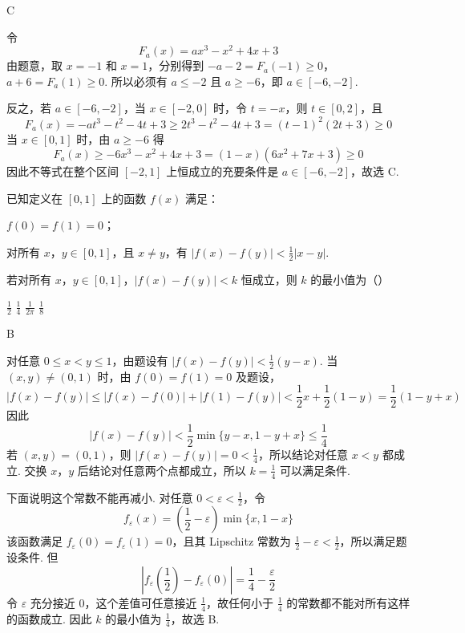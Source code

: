 \begin{answer}
C
\end{answer}

\begin{solution}
令
\[
F_a(x)=ax^3-x^2+4x+3
\]
由题意，取 \(x=-1\) 和 \(x=1\)，分别得到
\(-a-2=F_a(-1)\geqslant0\)，\(a+6=F_a(1)\geqslant0\).
所以必须有 \(a\leqslant-2\) 且 \(a\geqslant-6\)，即 \(a\in[-6,-2]\).

反之，若 \(a\in[-6,-2]\)，当 \(x\in[-2,0]\) 时，令 \(t=-x\)，则 \(t\in[0,2]\)，且
\[
F_a(x)=-at^3-t^2-4t+3
\geqslant2t^3-t^2-4t+3
=(t-1)^2(2t+3)\geqslant0
\]
当 \(x\in[0,1]\) 时，由 \(a\geqslant-6\) 得
\[
F_a(x)\geqslant-6x^3-x^2+4x+3
=(1-x)(6x^2+7x+3)\geqslant0
\]
因此不等式在整个区间 \([-2,1]\) 上恒成立的充要条件是 \(a\in[-6,-2]\)，故选 C.
\end{solution}

\begin{problem}
已知定义在 \([0,1]\) 上的函数 \(f(x)\) 满足：

\begin{circlelist}
\item \(f(0) = f(1) = 0\)；
\item 对所有 \(x\)，\(y\in[0,1]\)，且 \(x \neq y\)，有 \(|f(x) - f(y)| < \frac{1}{2} |x - y|\).
\end{circlelist}

若对所有 \(x\)，\(y\in[0,1]\)，\(|f(x) - f(y)| < k\) 恒成立，则 \(k\) 的最小值为（\quad）

\choices
    {\(\frac{1}{2}\)}
    {\( \frac{1}{4} \)}
    {\( \frac{1}{2\pi} \)}
    {\(\frac{1}{8}\)}
\end{problem}

\begin{answer}
B
\end{answer}

\begin{solution}
对任意 \(0\leqslant x<y\leqslant1\)，由题设有 \(|f(x)-f(y)|<\frac12(y-x)\). 当 \((x,y)\neq(0,1)\) 时，由 \(f(0)=f(1)=0\) 及题设，
\[
|f(x)-f(y)|\leqslant|f(x)-f(0)|+|f(1)-f(y)|<\frac12x+\frac12(1-y)=\frac12(1-y+x)
\]
因此
\[
|f(x)-f(y)|<\frac12\min\{y-x,1-y+x\}\leqslant\frac14
\]
若 \((x,y)=(0,1)\)，则 \(|f(x)-f(y)|=0<\frac14\)，所以结论对任意 \(x<y\) 都成立.
交换 \(x\)，\(y\) 后结论对任意两个点都成立，所以 \(k=\frac14\) 可以满足条件.

下面说明这个常数不能再减小. 对任意 \(0<\varepsilon<\frac12\)，令
\[
f_\varepsilon(x)=\left(\frac12-\varepsilon\right)\min\{x,1-x\}
\]
该函数满足 \(f_\varepsilon(0)=f_\varepsilon(1)=0\)，且其 Lipschitz 常数为 \(\frac12-\varepsilon<\frac12\)，所以满足题设条件. 但
\[
\left|f_\varepsilon\left(\frac12\right)-f_\varepsilon(0)\right|=\frac14-\frac\varepsilon2
\]
令 \(\varepsilon\) 充分接近 \(0\)，这个差值可任意接近 \(\frac14\)，故任何小于 \(\frac14\) 的常数都不能对所有这样的函数成立. 因此 \(k\) 的最小值为 \(\frac14\)，故选 B.
\end{solution}

